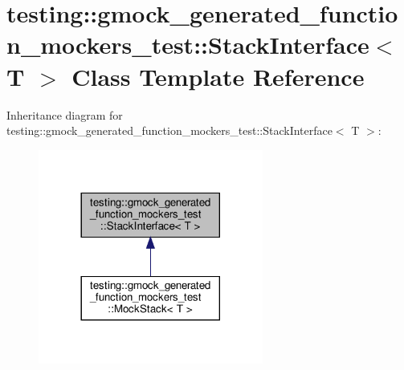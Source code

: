 \hypertarget{classtesting_1_1gmock__generated__function__mockers__test_1_1_stack_interface}{}\section{testing\+:\+:gmock\+\_\+generated\+\_\+function\+\_\+mockers\+\_\+test\+:\+:Stack\+Interface$<$ T $>$ Class Template Reference}
\label{classtesting_1_1gmock__generated__function__mockers__test_1_1_stack_interface}


Inheritance diagram for testing\+:\+:gmock\+\_\+generated\+\_\+function\+\_\+mockers\+\_\+test\+:\+:Stack\+Interface$<$ T $>$\+:
\nopagebreak
\begin{figure}[H]
\begin{center}
\leavevmode
\includegraphics[width=209pt]{classtesting_1_1gmock__generated__function__mockers__test_1_1_stack_interface__inherit__graph}
\end{center}
\end{figure}
